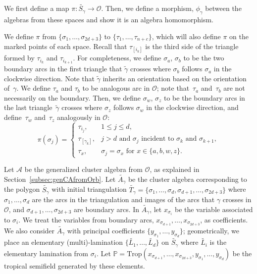 \documentclass[11pt]{article}
\newcommand{\Orb}{\mathcal{O}}
\numberwithin{equation}{section}
\begin{document}
We first define a map $\pi\colon \widetilde{S_\gamma} \to \mathcal{O}$. Then, we define a morphism, $\phi_\gamma$ between the algebras from these spaces and show it is an algebra homomorphism.

We define $\pi$ from $\{\sigma_1,\ldots, \sigma_{2d +3}\}$ to $\{\tau_1,\ldots, \tau_{n+c}\}$, which will also define $\pi$ on the marked points of each space. Recall that $\tau_{[i_k]}$ is the third side of the triangle formed by $\tau_{i_k}$ and $\tau_{i_{k+1}}$. For completeness, we define $\sigma_a$, $\sigma_b$ to be the two boundary arcs in the first triangle that $\widetilde{\gamma}$ crosses where $\sigma_b$ follows $\sigma_a$ in the clockwise direction. Note that $\widetilde{\gamma}$ inherits an orientation based on the orientation of~$\gamma$. We define $\tau_a$ and $\tau_b$ to be analogous arc in $\mathcal{O}$; note that~$\tau_a$ and~$\tau_b$ are not necessarily on the boundary. Then, we define $\sigma_w$, $\sigma_z$ to be the boundary arcs in the last triangle~$\widetilde{\gamma}$ crosses where $\sigma_z$ follows $\sigma_w$ in the clockwise direction, and define~$\tau_w$ and~$\tau_z$ analogously in $\mathcal{O}$:
\[
\pi(\sigma_j) = \begin{cases} \tau_{i_j}, & 1 \leq j \leq d, \\ \tau_{[\gamma_k]}, & j > d \text{ and } \sigma_j \text{ incident to } \sigma_k \text{ and } \sigma_{k+1}, \\
\tau_{x}, & \sigma_j = \sigma_x \text{ for } x \in \{a,b,w,z\}. \end{cases}
\]

Let $\mathcal{A}$ be the generalized cluster algebra from $\Orb$, as explained in Section~\ref{subsec:genCAfromOrb}. Let $\widetilde{A_\gamma}$ be the cluster algebra corresponding to the polygon $\widetilde{S_\gamma}$ with initial triangulation $\widetilde{T_\gamma} = \{\sigma_1,\ldots, \sigma_d,\sigma_{d+1},\allowbreak \ldots, \sigma_{2d + 3}\}$ where $\sigma_1,\ldots, \sigma_d$ are the arcs in the triangulation and images of the arcs that $\gamma$ crosses in $\Orb$, and $\sigma_{d+1},\ldots, \sigma_{2d + 3}$ are boundary arcs.
In $\widetilde{A_\gamma}$, let $x_{\sigma_i}$ be the variable associated to $\sigma_i$. We treat the variables from boundary arcs, $x_{\sigma_{d+1}},\ldots, x_{\sigma_{2d+3}}$, as coefficients. We also consider $\widetilde{A_\gamma}$ with principal coefficients $\{y_{\sigma_1},\ldots, y_{\sigma_d}\}$; geometrically, we place an elementary (multi)-lamination $\big\{\widetilde{L_1},\ldots, \widetilde{L_d}\big\}$ on $\widetilde{S_\gamma}$ where $\widetilde{L_i}$ is the elementary lamination from $\sigma_i$.
 Let $\mathbb{P} = \text{Trop}(x_{\sigma_{d+1}},\ldots,x_{\sigma_{2d+3}}, y_{\sigma_1},\ldots, y_{\sigma_d})$ be the tropical semifield generated by these elements.
\end{document}
